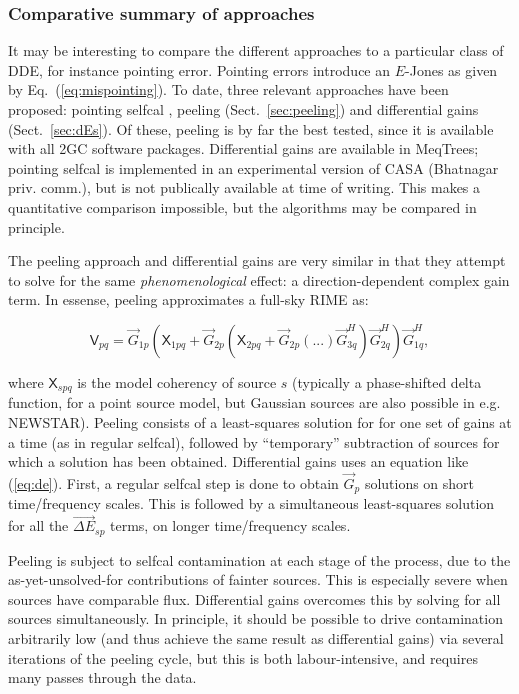 \documentclass[referee]{aa}
\newcommand{\herm}{H}
\newcommand{\jones}[2]{\vec {#1}_{#2}}
\newcommand{\jonesT}[2]{\vec {#1}^{\herm}_{#2}}
\newcommand{\coh}[2]{\mathsf{{#1}}_{{#2}}}
\begin{document}
\subsubsection{Comparative summary of approaches}

It may be interesting to compare the different approaches to a particular class of DDE, for instance pointing error. Pointing errors introduce an $E$-Jones as given by Eq.~(\ref{eq:mispointing}). To date, three relevant approaches have been proposed: pointing selfcal \citep{SB:pointing}, peeling (Sect.~\ref{sec:peeling}) and differential gains (Sect.~\ref{sec:dEs}). Of these, peeling is by far the best tested, since it is available with all 2GC software packages. Differential gains are available in MeqTrees; pointing selfcal is implemented in an experimental version of CASA (Bhatnagar priv. comm.), but is not publically available at time of writing. This makes a quantitative comparison impossible, but the algorithms may be compared in principle.

The peeling approach and differential gains are very similar in that they attempt to solve for the same \emph{phenomenological} effect: a direction-dependent complex gain term. In essense, peeling approximates a full-sky RIME as:

\[
\coh{V}{pq} = \jones{G}{1p}(\coh{X}{1pq} + \jones{G}{2p}(\coh{X}{2pq} + \jones{G}{2p}(...)\jonesT{G}{3q})\jonesT{G}{2q})\jonesT{G}{1q},
\]

where $\coh{X}{spq}$ is the model coherency of source $s$ (typically a phase-shifted delta function, for a point source model, but Gaussian sources are also possible in e.g. NEWSTAR). Peeling consists of a least-squares solution for for one set of gains at a time (as in regular selfcal), followed by ``temporary'' subtraction of sources for which a solution has been obtained. Differential gains uses an equation like (\ref{eq:de}). First, a regular selfcal step is done to obtain $\jones{G}{p}$ solutions on short time/frequency scales. This is followed by a simultaneous least-squares solution for all the $\jones{\Delta E}{sp}$ terms, on longer time/frequency scales. 

Peeling is subject to selfcal contamination at each stage of the process, due to the as-yet-unsolved-for contributions of fainter sources. This is especially severe when sources have comparable flux. Differential gains overcomes this by solving for all sources simultaneously. In principle, it should be possible to drive contamination arbitrarily low (and thus achieve the same result as differential gains) via several iterations of the peeling cycle, but this is both labour-intensive, and requires many passes through the data.
\end{document}
